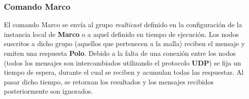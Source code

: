 \subsubsection{Comando \textbf{Marco}}


El comando Marco se envía al grupo \textit{multicast} definido en la configuración de la instancia local de \textbf{Marco} o a aquel definido en tiempo de ejecución. Los nodos suscritos a dicho grupo (aquellos que pertenecen a la malla) reciben el mensaje y emiten una respuesta \textbf{Polo}. Debido a la falta de una conexión entre los nodos (todos los mensajes son intercambiados utilizando el protocolo \textbf{UDP}) se fija un tiempo de espera, durante el cual se reciben y acumulan todas las respuestas. Al pasar dicho tiempo, se retornan los resultados y los mensajes recibidos posteriormente son ignorados.



